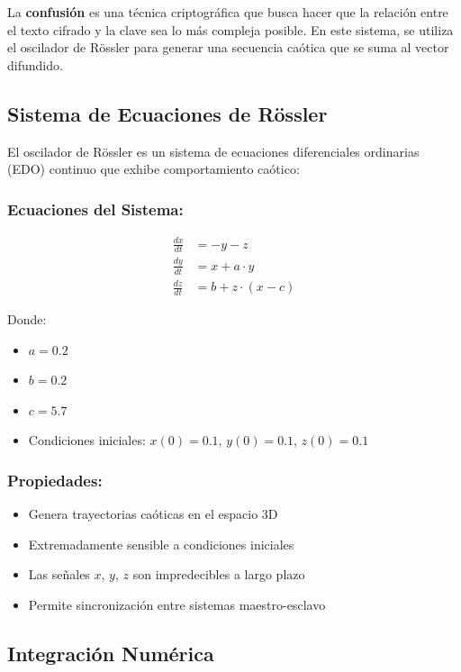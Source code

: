 \documentclass[12pt,a4paper]{article}
\begin{document}
La \textbf{confusión} es una técnica criptográfica que busca hacer que la relación entre el texto cifrado y la clave sea lo más compleja posible. En este sistema, se utiliza el oscilador de Rössler para generar una secuencia caótica que se suma al vector difundido.

\subsection{Sistema de Ecuaciones de Rössler}

El oscilador de Rössler es un sistema de ecuaciones diferenciales ordinarias (EDO) continuo que exhibe comportamiento caótico:

\subsubsection*{Ecuaciones del Sistema:}
\begin{equation}
\begin{aligned}
\frac{dx}{dt} &= -y - z \\
\frac{dy}{dt} &= x + a \cdot y \\
\frac{dz}{dt} &= b + z \cdot (x - c)
\end{aligned}
\label{eq:rossler}
\end{equation}

Donde:
\begin{itemize}
    \item $a = 0.2$
    \item $b = 0.2$
    \item $c = 5.7$
    \item Condiciones iniciales: $x(0) = 0.1$, $y(0) = 0.1$, $z(0) = 0.1$
\end{itemize}

\subsubsection*{Propiedades:}
\begin{itemize}
    \item Genera trayectorias caóticas en el espacio 3D
    \item Extremadamente sensible a condiciones iniciales
    \item Las señales $x$, $y$, $z$ son impredecibles a largo plazo
    \item Permite sincronización entre sistemas maestro-esclavo
\end{itemize}

\subsection{Integración Numérica}
\end{document}
